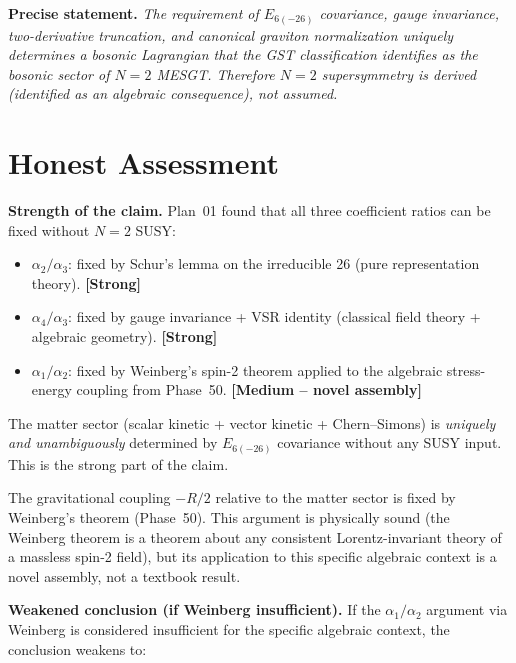 \medskip

\textbf{Precise statement.}
\textit{The requirement of $E_{6(-26)}$ covariance, gauge invariance,
two-derivative truncation, and canonical graviton normalization uniquely
determines a bosonic Lagrangian that the GST classification identifies
as the bosonic sector of $N=2$ MESGT. Therefore $N=2$ supersymmetry is
derived (identified as an algebraic consequence), not assumed.}



\section{Honest Assessment}

\textbf{Strength of the claim.}
Plan~01 found that all three coefficient ratios can be fixed without
$N=2$ SUSY:
\begin{itemize}
  \item $\alpha_2/\alpha_3$: fixed by Schur's lemma on the irreducible 26
    (pure representation theory). \textbf{[Strong]}
  \item $\alpha_4/\alpha_3$: fixed by gauge invariance + VSR identity
    (classical field theory + algebraic geometry). \textbf{[Strong]}
  \item $\alpha_1/\alpha_2$: fixed by Weinberg's spin-2 theorem
    applied to the algebraic stress-energy coupling from Phase~50.
    \textbf{[Medium -- novel assembly]}
\end{itemize}

The matter sector (scalar kinetic + vector kinetic + Chern--Simons) is
\emph{uniquely and unambiguously} determined by $E_{6(-26)}$ covariance
without any SUSY input. This is the strong part of the claim.

The gravitational coupling $-R/2$ relative to the matter sector is fixed
by Weinberg's theorem (Phase~50). This argument is physically sound
(the Weinberg theorem is a theorem about any consistent Lorentz-invariant
theory of a massless spin-2 field), but its application to this specific
algebraic context is a novel assembly, not a textbook result.

\textbf{Weakened conclusion (if Weinberg insufficient).}
If the $\alpha_1/\alpha_2$ argument via Weinberg is considered
insufficient for the specific algebraic context, the conclusion weakens
to:


